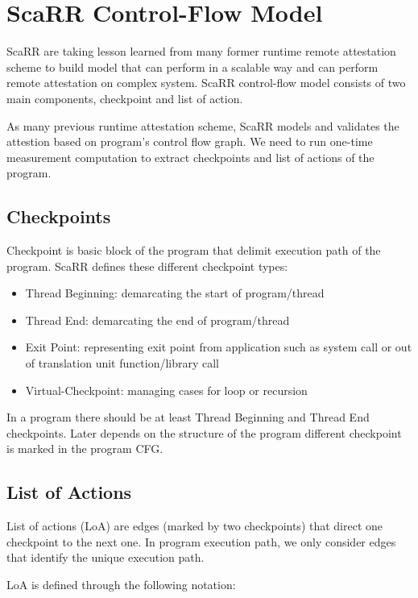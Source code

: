\section{ScaRR Control-Flow Model} \label{sec:scarr-model}

ScaRR \cite{toffaliniScaRRScalableRuntime2019} are taking lesson learned from many former runtime remote attestation scheme to build model that can perform in a scalable way and can perform remote attestation on complex system. ScaRR control-flow model consists of two main components, checkpoint and list of action. 

As many previous runtime attestation scheme, ScaRR models and validates the attestion based on program's control flow graph. We need to run one-time measurement computation to extract checkpoints and list of actions of the program.

\subsection{Checkpoints} \label{sec:scarr-checkpoints}
Checkpoint is basic block of the program that delimit execution path of the program. ScaRR defines these different checkpoint types:
\begin{itemize}
    \item Thread Beginning: demarcating the start of program/thread
    \item Thread End: demarcating the end of program/thread
    \item Exit Point: representing exit point from application such as system call or out of translation unit function/library call
    \item Virtual-Checkpoint: managing cases for loop or recursion
\end{itemize}

In a program there should be at least Thread Beginning and Thread End checkpoints. Later depends on the structure of the program different checkpoint is marked in the program CFG.

\subsection{List of Actions}

List of actions (LoA) are edges (marked by two checkpoints) that direct one checkpoint to the next one. In program execution path, we only consider edges that identify the unique execution path.

LoA is defined through the following notation:

